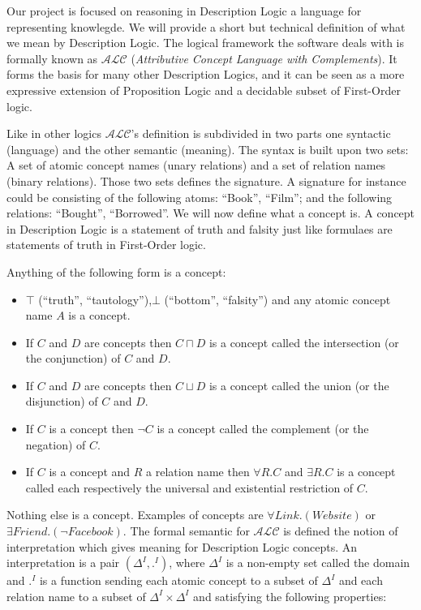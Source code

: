 Our project is focused on reasoning in Description Logic a language
for representing knowlegde.  We will provide a short but technical
definition of what we mean by Description Logic. The logical framework
the software deals with is formally known as $\mathcal{ALC}$
(\textit{Attributive Concept Language with Complements}). It forms the
basis for many other Description Logics, and it can be seen as a more
expressive extension of Proposition Logic and a decidable subset of
First-Order logic.

Like in other logics $\mathcal{ALC}$'s definition is subdivided in two
parts one syntactic (language) and the other semantic (meaning). The
syntax is built upon two sets: A set of atomic concept names (unary
relations) and a set of relation names (binary relations). Those two
sets defines the signature. A signature for instance could be
consisting of the following atoms: ``Book'', ``Film''; and the
following relations: ``Bought'', ``Borrowed''. We will now define what
a concept is. A concept in Description Logic is a statement of truth
and falsity just like formulaes are statements of truth in First-Order
logic.

Anything of the following form is a concept:
\begin{itemize}
\item $\top$ (``truth'', ``tautology''),$\bot$ (``bottom'', ``falsity'') and any atomic concept name $A$ is a concept.
\item If $C$ and $D$ are concepts then $C \sqcap D$ is a concept
  called the intersection (or the conjunction) of $C$ and $D$.
\item If $C$ and $D$ are concepts then $C \sqcup D$ is a concept
  called the union (or the disjunction) of $C$ and $D$.
\item If $C$ is a concept then $\neg C$ is a concept called the complement (or the
  negation) of $C$.
\item If $C$ is a concept and $R$ a relation name then $\forall R . C$
  and $\exists R . C$ is a concept called each respectively the
  universal and existential restriction of $C$.
\end{itemize}

Nothing else is a concept. Examples of concepts are $\forall Link
. (Website)$ or $\exists Friend . (\neg Facebook)$. The 
formal semantic for $\mathcal{ALC}$ is defined the notion of
interpretation which gives meaning for Description Logic concepts. An
interpretation is a pair $(\Delta^{I},.^{I})$, where $\Delta^{I}$ is a
non-empty set called the domain and $.^{I}$ is a function sending each
atomic concept to a subset of $\Delta^{I}$ and each relation name to a
subset of $\Delta^{I} \times \Delta^{I}$ and satisfying the following 
properties:

